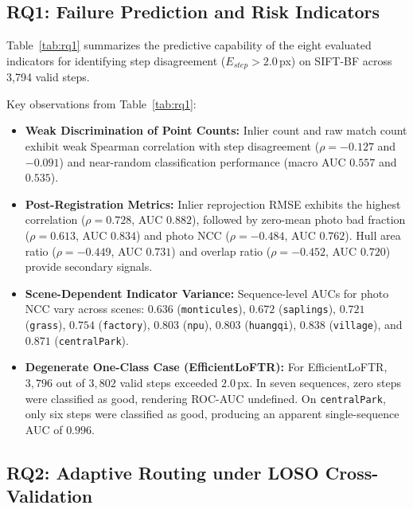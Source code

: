 \documentclass[conference]{IEEEtran}
\begin{document}
\subsection{RQ1: Failure Prediction and Risk Indicators}
\label{subsec:rq1_results}

Table~\ref{tab:rq1} summarizes the predictive capability of the eight evaluated indicators for identifying step disagreement ($E_{step} > 2.0$\,px) on SIFT-BF across 3,794 valid steps.

\begin{table}[h]
\centering
\caption{Step-Level Failure Prediction Metrics for SIFT-BF (3,794 Valid Evaluation Steps Across Eight Sequences)}
\label{tab:rq1}
\footnotesize

\end{table}

Key observations from Table~\ref{tab:rq1}:
\begin{itemize}
    \item \textbf{Weak Discrimination of Point Counts:} Inlier count and raw match count exhibit weak Spearman correlation with step disagreement ($\rho = -0.127$ and $-0.091$) and near-random classification performance (macro AUC $0.557$ and $0.535$).
    \item \textbf{Post-Registration Metrics:} Inlier reprojection RMSE exhibits the highest correlation ($\rho = 0.728$, AUC $0.882$), followed by zero-mean photo bad fraction ($\rho = 0.613$, AUC $0.834$) and photo NCC ($\rho = -0.484$, AUC $0.762$). Hull area ratio ($\rho = -0.449$, AUC $0.731$) and overlap ratio ($\rho = -0.452$, AUC $0.720$) provide secondary signals.
    \item \textbf{Scene-Dependent Indicator Variance:} Sequence-level AUCs for photo NCC vary across scenes: $0.636$ (\texttt{monticules}), $0.672$ (\texttt{saplings}), $0.721$ (\texttt{grass}), $0.754$ (\texttt{factory}), $0.803$ (\texttt{npu}), $0.803$ (\texttt{huangqi}), $0.838$ (\texttt{village}), and $0.871$ (\texttt{centralPark}).
    \item \textbf{Degenerate One-Class Case (EfficientLoFTR):} For EfficientLoFTR, $3{,}796$ out of $3{,}802$ valid steps exceeded $2.0$\,px. In seven sequences, zero steps were classified as good, rendering ROC-AUC undefined. On \texttt{centralPark}, only six steps were classified as good, producing an apparent single-sequence AUC of $0.996$.
\end{itemize}

\subsection{RQ2: Adaptive Routing under LOSO Cross-Validation}
\label{subsec:rq2_results}
\end{document}
